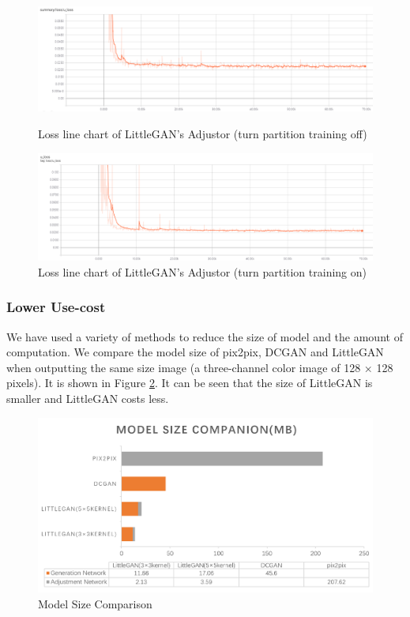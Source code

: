 \begin{figure}
    \begin{minipage}[t]{0.49\linewidth}
        \centering
        \includegraphics[width=\textwidth]{figures/loss_part_off_u.png}
        \caption{Loss line chart of LittleGAN's Adjustor (turn partition training off)}
        \label{loss_part_off_u}
    \end{minipage}
        \hfill
    \begin{minipage}[t]{0.49\linewidth}
        \centering
        \includegraphics[width=\textwidth]{figures/loss_part_on_u.png}
        \caption{Loss line chart of LittleGAN's Adjustor (turn partition training on)}
        \label{loss_part_on_u}
    \end{minipage}
\end{figure}


\subsubsection*{Lower Use-cost}
We have used a variety of methods to reduce the size of model and the amount of computation.
We compare the model size of pix2pix, DCGAN and LittleGAN when outputting the same size image (a three-channel color image of 128 × 128 pixels).
It is shown in Figure \ref{result_model_size}.
It can be seen that the size of LittleGAN is smaller and LittleGAN costs less.

\begin{figure}
    \begin{center}
    \includegraphics[width=\textwidth]{figures/result_model_size.png}
    \caption{Model Size Comparison}
    \label{result_model_size}
    \end{center}
\end{figure}



